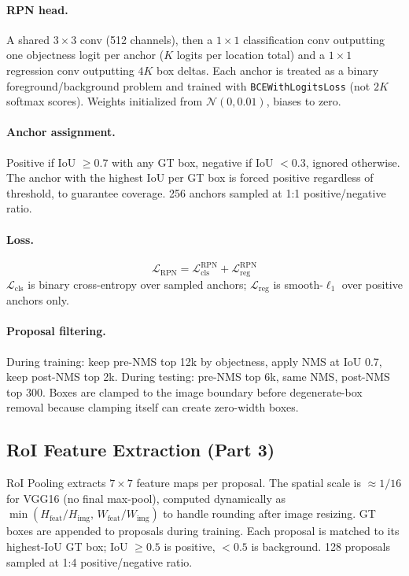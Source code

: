 \documentclass[11pt]{article}
\begin{document}
\paragraph{RPN head.}
A shared $3\times3$ conv (512 channels), then a $1\times1$ classification conv outputting one objectness logit per anchor ($K$ logits per location total) and a $1\times1$ regression conv outputting $4K$ box deltas. Each anchor is treated as a binary foreground/background problem and trained with \texttt{BCEWithLogitsLoss} (not $2K$ softmax scores). Weights initialized from $\mathcal{N}(0, 0.01)$, biases to zero.

\paragraph{Anchor assignment.}
Positive if IoU $\geq 0.7$ with any GT box, negative if IoU $< 0.3$, ignored otherwise. The anchor with the highest IoU per GT box is forced positive regardless of threshold, to guarantee coverage. 256 anchors sampled at 1:1 positive/negative ratio.

\paragraph{Loss.}
\begin{equation}
    \mathcal{L}_\text{RPN} = \mathcal{L}_\text{cls}^\text{RPN} + \mathcal{L}_\text{reg}^\text{RPN}
\end{equation}
$\mathcal{L}_\text{cls}$ is binary cross-entropy over sampled anchors; $\mathcal{L}_\text{reg}$ is smooth-$\ell_1$ over positive anchors only.

\paragraph{Proposal filtering.}
During training: keep pre-NMS top 12k by objectness, apply NMS at IoU 0.7, keep post-NMS top 2k. During testing: pre-NMS top 6k, same NMS, post-NMS top 300. Boxes are clamped to the image boundary before degenerate-box removal because clamping itself can create zero-width boxes.

\subsection{RoI Feature Extraction (Part 3)}

RoI Pooling extracts $7\times7$ feature maps per proposal. The spatial scale is $\approx 1/16$ for VGG16 (no final max-pool), computed dynamically as $\min(H_\text{feat}/H_\text{img},\, W_\text{feat}/W_\text{img})$ to handle rounding after image resizing. GT boxes are appended to proposals during training. Each proposal is matched to its highest-IoU GT box; IoU $\geq 0.5$ is positive, $< 0.5$ is background. 128 proposals sampled at 1:4 positive/negative ratio.
\end{document}
